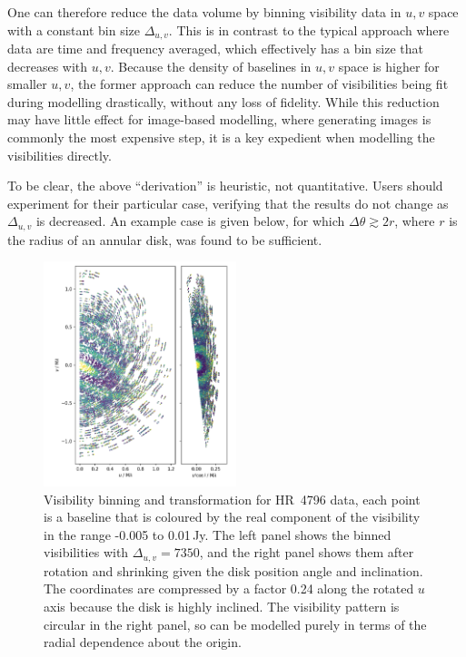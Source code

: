 \documentclass[fleqn,usenatbib]{mnras}
\begin{document}
One can therefore reduce the data volume by binning visibility data in $u,v$ space with a constant bin size $\Delta_{u,v}$. This is in contrast to the typical approach where data are time and frequency averaged, which effectively has a bin size that decreases with $u,v$. Because the density of baselines in $u,v$ space is higher for smaller $u,v$, the former approach can reduce the number of visibilities being fit during modelling drastically, without any loss of fidelity. While this reduction may have little effect for image-based modelling, where generating images is commonly the most expensive step, it is a key expedient when modelling the visibilities directly.

To be clear, the above ``derivation'' is heuristic, not quantitative. Users should experiment for their particular case, verifying that the results do not change as $\Delta_{u,v}$ is decreased. An example case is given below, for which $\Delta \theta \gtrsim 2r$, where $r$ is the radius of an annular disk, was found to be sufficient.

\begin{figure}
    \centering
    \hspace{-0.5cm}\includegraphics[width=0.5\textwidth]{vis_avg.png}
    \caption{Visibility binning and transformation for HR~4796 data, each point is a baseline that is coloured by the real component of the visibility in the range -0.005 to 0.01\,Jy. The left panel shows the binned visibilities with $\Delta_{u,v}=7350$, and the right panel shows them after rotation and shrinking given the disk position angle and inclination. The coordinates are compressed by a factor 0.24 along the rotated $u$ axis because the disk is highly inclined. The visibility pattern is circular in the right panel, so can be modelled purely in terms of the radial dependence about the origin.}
    \label{fig:bin}
\end{figure}
\end{document}
